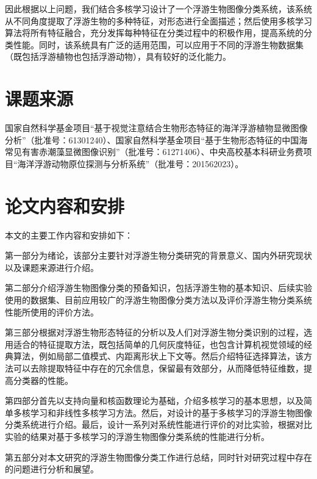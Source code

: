 因此根据以上问题，我们结合多核学习设计了一个浮游生物图像分类系统，该系统从不同角度提取了浮游生物的多种特征，对形态进行全面描述；然后使用多核学习算法将所有特征融合，充分发挥每种特征在分类过程中的积极作用，提高系统的分类性能。同时，该系统具有广泛的适用范围，可以应用于不同的浮游生物数据集（既包括浮游植物也包括浮游动物），具有较好的泛化能力。


\section{课题来源}
\label{sec:complicatedtable}

国家自然科学基金项目“基于视觉注意结合生物形态特征的海洋浮游植物显微图像分析”（批准号：61301240）、国家自然科学基金项目“基于生物形态特征的中国海常见有害赤潮藻显微图像识别”（批准号：61271406）、中央高校基本科研业务费项目“海洋浮游动物原位探测与分析系统”（批准号：201562023）。


\section{论文内容和安排}
\label{sec:tableother}

本文的主要工作内容和安排如下：

第一部分为绪论，该部分主要针对浮游生物分类研究的背景意义、国内外研究现状以及课题来源进行介绍。

第二部分介绍浮游生物图像分类的预备知识，包括浮游生物的基本知识、后续实验使用的数据集、目前应用较广的浮游生物图像分类方法以及评价浮游生物分类系统性能所使用的评价方法。

第三部分根据对浮游生物形态特征的分析以及人们对浮游生物分类识别的过程，选用适合的特征提取方法，既包括简单的几何灰度特征，也包含计算机视觉领域的经典算法，例如局部二值模式、内距离形状上下文等。然后介绍特征选择算法，该方法可以去除提取特征中存在的冗余信息，保留最有效部分，从而降低特征维数，提高分类器的性能。

第四部分首先以支持向量和核函数理论为基础，介绍多核学习的基本思想，以及简单多核学习和非线性多核学习方法。然后，对设计的基于多核学习的浮游生物图像分类系统进行介绍。最后，设计一系列对系统性能进行评价的对比实验，根据对比实验的结果对基于多核学习的浮游生物图像分类系统的性能进行分析。

第五部分对本文研究的浮游生物图像分类工作进行总结，同时针对研究过程中存在的问题进行分析和展望。





